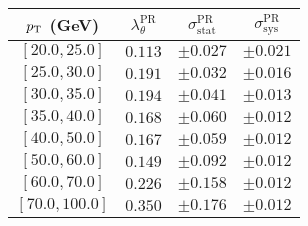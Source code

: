 \begin{tabular}{c||c||c|c}
$p_\text{T}$ (GeV) & $\lambda_\theta^{\text{PR}}$ & $\sigma_{\text{stat}}^{\text{PR}}$ & $\sigma_{\text{sys}}^{\text{PR}}$  \\
\hline
$[20.0, 25.0]$& $0.113$ & $\pm0.027$ & $\pm0.021$\\
$[25.0, 30.0]$& $0.191$ & $\pm0.032$ & $\pm0.016$\\
$[30.0, 35.0]$& $0.194$ & $\pm0.041$ & $\pm0.013$\\
$[35.0, 40.0]$& $0.168$ & $\pm0.060$ & $\pm0.012$\\
$[40.0, 50.0]$& $0.167$ & $\pm0.059$ & $\pm0.012$\\
$[50.0, 60.0]$& $0.149$ & $\pm0.092$ & $\pm0.012$\\
$[60.0, 70.0]$& $0.226$ & $\pm0.158$ & $\pm0.012$\\
$[70.0, 100.0]$& $0.350$ & $\pm0.176$ & $\pm0.012$\\
\end{tabular}
